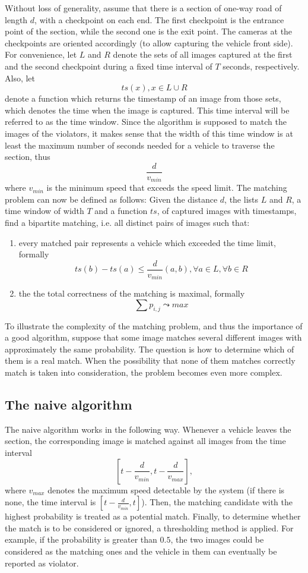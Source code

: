 \documentclass[times, utf8, zavrsni]{fer}
\begin{document}
Without loss of generality, assume that there is a section of one-way road of
length $d$, with a checkpoint on each end. The first checkpoint is the entrance
point of the section, while the second one is the exit point. The cameras at the
checkpoints are oriented accordingly (to allow capturing the vehicle front
side). For convenience, let $L$ and $R$ denote the sets of all images captured
at the first and the second checkpoint during a fixed time interval of $T$
seconds, respectively. Also, let \[ ts(x), x \in L \cup R \] denote a function
which returns the timestamp of an image from those sets, which denotes the time when
the image is captured. This time interval will be referred to as the time
window. Since the algorithm is supposed to match the images of the violators, it
makes sense that the width of this time window is at least the maximum number of
seconds needed for a vehicle to traverse the section, thus \[ \frac{d}{v_{min}}
\] where $v_{min}$ is the minimum speed that exceeds the speed limit. The
matching problem can now be defined as follows: Given the distance $d$, the
lists $L$ and $R$, a time window of width $T$ and a function $ts$, of captured
images with timestamps, find a bipartite matching, i.e. all distinct pairs of
images such that:
\begin{enumerate}
  \item every matched pair represents a vehicle which exceeded the time
  limit, formally \[ ts(b) - ts(a) \leq \frac{d}{v_{min}} (a, b), \forall a \in
  L, \forall b \in R
  \]
  \item the the total correctness of the matching is maximal, formally \[
  \sum{p_{i,j} \leadsto max}
  \]
\end{enumerate}

To illustrate the complexity of the matching problem, and thus the importance of
a good algorithm, suppose that some image matches several different images with
approximately the same probability. The question is how to determine which of
them is a real match. When the possibility that none of them matches correctly
match is taken into consideration, the problem becomes even more complex.


\subsection{The naive algorithm}

The naive algorithm works in the following way. Whenever a vehicle leaves the
section, the corresponding image is matched against all images from the time
interval \[ [t - \frac{d}{v_{min}}, t - \frac{d}{v_{max}}], \] where $v_{max}$
denotes the maximum speed detectable by the system (if there is none, the time
interval is $[t - \frac{d}{v_{min}}, t]$). Then, the matching candidate with the
highest probability is treated as a potential match. Finally, to determine
whether the match is to be considered or ignored, a thresholding method is
applied. For example, if the probability is greater than $0.5$, the two images
could be considered as the matching ones and the vehicle in them can eventually
be reported as violator.
\end{document}
